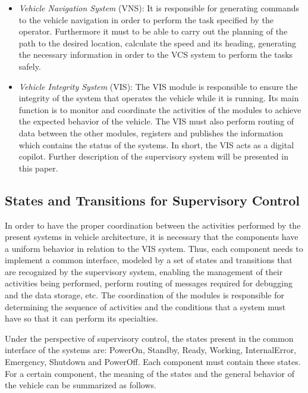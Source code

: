 \documentclass[conference]{IEEEtran}
\begin{document}
\begin{itemize}
	\item \textit{Vehicle Navigation System} (VNS): It is responsible for generating commands to the vehicle navigation in order to perform the task specified by the operator. Furthermore it must to be able to carry out the planning of the path to the desired location, calculate the speed and its heading, generating the necessary information in order to the VCS system to perform the tasks safely.

	\item \textit{Vehicle Integrity System} (VIS): The VIS module is responsible to ensure the integrity of the system that operates the vehicle while it is running. Its main function is to monitor and coordinate the activities of the modules to achieve the expected behavior of the vehicle. The VIS must also perform routing of data between the other modules, registers and publishes the information which contains the status of the systems. In short, the VIS acts as a digital copilot. Further description of the supervisory system will be presented in this paper.
\end{itemize}
%
\subsection{States and Transitions for Supervisory Control}\label{subsec:states_transitions}

In order to have the proper coordination between the activities performed by the present systems in vehicle architecture, it is necessary that the components have a uniform behavior in relation to the VIS system. Thus, each component needs to implement a common interface, modeled by a set of states and transitions that are recognized by the supervisory system, enabling the management of their activities being performed, perform routing of messages required for debugging and the data storage, etc. The coordination of the modules is responsible for determining the sequence of activities and the conditions that a system must have so that it can perform its specialties.

Under the perspective of supervisory control, the states present in the common interface of the systems are: PowerOn, Standby, Ready, Working, InternalError, Emergency, Shutdown and PowerOff. Each component must contain these states. For a certain component, the meaning of the states and the general behavior of the vehicle can be summarized as follows.
\end{document}
